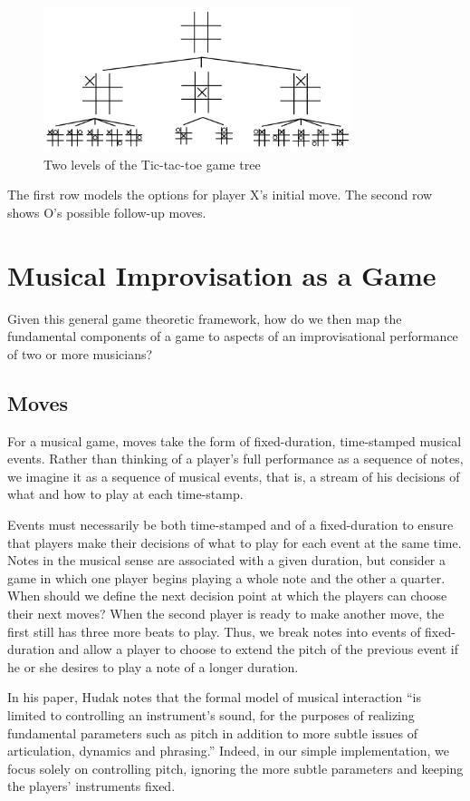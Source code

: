 \documentclass{article}
\begin{document}
\begin{figure}
\centering
\includegraphics[width=90mm]{ttt.jpg}
\caption{Two levels of the Tic-tac-toe game tree}
\end{figure}

The first row models the options for player X's initial move.  The second row 
shows O's possible follow-up moves.

\section{Musical Improvisation as a
Game}

Given this general game theoretic framework, how do we then map the
fundamental components of a game to aspects of an improvisational
performance of two or more musicians?

\subsection{Moves}
For a musical game, moves take the form of fixed-duration, time-stamped
musical events. Rather than thinking of a player's full performance as a
sequence of notes, we imagine it as a sequence of musical events, that
is, a stream of his decisions of what and how to play at each
time-stamp.

Events must necessarily be both time-stamped and of a fixed-duration to
ensure that players make their decisions of what to play for each event
at the same time. Notes in the musical sense are associated with a given
duration, but consider a game in which one player begins playing a whole
note and the other a quarter.  When should we define the next decision
point at which the players can choose their next moves? When the second
player is ready to make another move, the first still has three more
beats to play. Thus, we break notes into events of fixed-duration and
allow a player to choose to extend the pitch of the previous event if he
or she desires to play a note of a longer duration.

In his paper, Hudak notes that the formal model of musical interaction
``is limited to controlling an instrument's sound, for the purposes of
realizing fundamental parameters such as pitch in addition to more
subtle issues of articulation, dynamics and phrasing.'' Indeed, in our
simple implementation, we focus solely on controlling pitch, ignoring
the more subtle parameters and keeping the players' instruments fixed.
\end{document}

